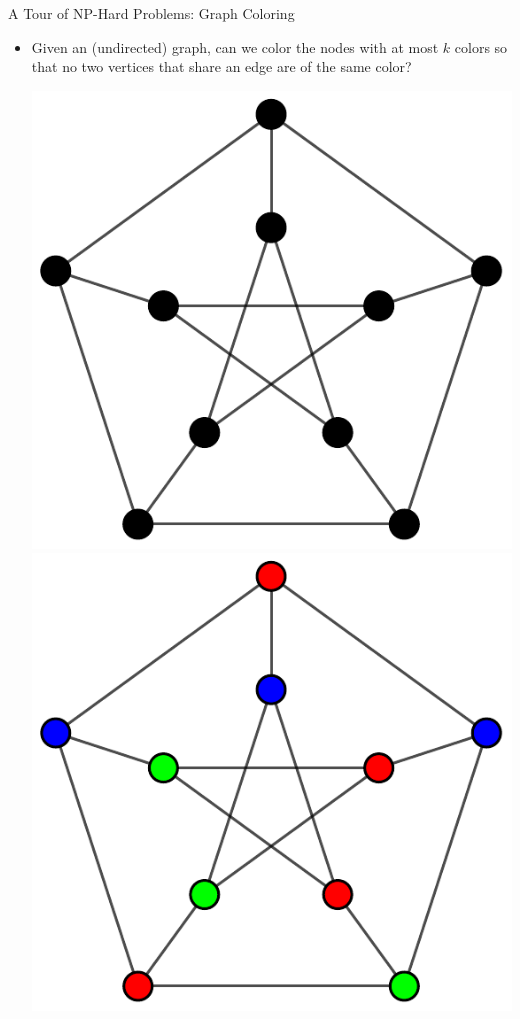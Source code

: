 \documentclass{beamer}
\begin{document}
\begin{frame}[t]{A Tour of NP-Hard Problems: Graph Coloring}
    \begin{itemize}
        \item Given an (undirected) graph, can we color the nodes with at most $k$ colors so that no two vertices that share an edge are of the same color?
        \begin{center}
            \begin{overprint}[.2\textwidth]
                \includegraphics[width=\textwidth]{petersen.pdf}
                \includegraphics[width=\textwidth]{petersen_colored.pdf}

\end{overprint}
\end{center}
\end{itemize}
\end{frame}
\end{document}
